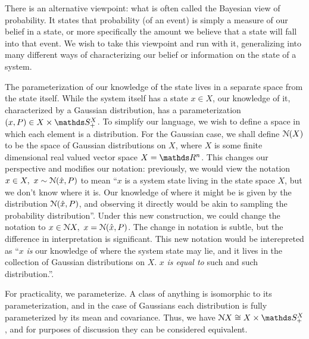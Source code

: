 
There is an alternative viewpoint: what is often called the Bayesian view of probability.
It states that probability (of an event) is simply a measure of our belief in a state, or more specifically the amount we believe that a state will fall into that event.
We wish to take this viewpoint and run with it, generalizing into many different ways of characterizing our belief or information on the state of a system.

The parameterization of our knowledge of the state lives in a separate space from the state itself.
While the system itself has a state $x\in X$, our knowledge of it, characterized by a Gaussian distribution, has a parameterization $(x,P)\in X\times \symmetric^X_+$.
To simplify our language, we wish to define a space in which each element is a distribution. For the Gaussian case, we shall define $\mathcal{N}(X)$ to be the space of Gaussian distributions on $X$, where $X$ is some finite dimensional real valued vector space $X=\reals^n$. This changes our perspective and modifies our notation: previously, we would view the notation $x\in X,\ x\sim \mathcal{N}(\hat{x}, P)$ to mean ``$x$ is a system state living in the state space $X$, but we don't know where it is. Our knowledge of where it might be is given by the distribution $\mathcal{N}(\hat{x}, P)$, and observing it directly would be akin to sampling the probability distribution''. Under this new construction, we could change the notation to $x\in \mathcal{N} X,\ x = \mathcal{N}(\hat{x}, P)$.
The change in notation is subtle, but the difference in interpretation is significant. This new notation would be interepreted as ``$x$ \emph{is} our knowledge of where the system state may lie, and it lives in the collection of Gaussian distributions on $X$. $x$ \emph{is equal to} such and such distribution.''.

For practicality, we parameterize. A class of anything is isomorphic to its parameterization, and in the case of Gaussians each distribution is fully parameterized by its mean and covariance. Thus, we have $\gaussian X \cong X\times \symmetric^X_+$, and for purposes of discussion they can be considered equivalent.

